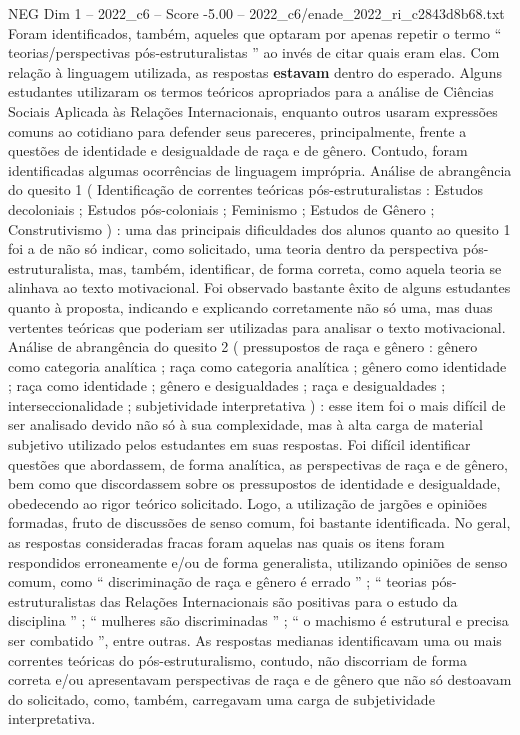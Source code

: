 \begin{textsample}{NEG Dim 1 – 2022\_c6 – Score -5.00 – 2022\_c6/enade\_2022\_ri\_c2843d8b68.txt}
Foram identificados, também, aqueles que optaram por apenas repetir o termo “ teorias/perspectivas pós-estruturalistas ” ao invés de citar quais eram elas.
Com relação à linguagem utilizada, as respostas \textbf{estavam} dentro do esperado.
Alguns estudantes utilizaram os termos teóricos apropriados para a análise de Ciências Sociais Aplicada às Relações Internacionais, enquanto outros usaram expressões comuns ao cotidiano para defender seus pareceres, principalmente, frente a questões de identidade e desigualdade de raça e de gênero.
Contudo, foram identificadas algumas ocorrências de linguagem imprópria.
Análise de abrangência do quesito 1 ( Identificação de correntes teóricas pós-estruturalistas : Estudos decoloniais ; Estudos pós-coloniais ; Feminismo ; Estudos de Gênero ; Construtivismo ) : uma das principais dificuldades dos alunos quanto ao quesito 1 foi a de não só indicar, como solicitado, uma teoria dentro da perspectiva pós-estruturalista, mas, também, identificar, de forma correta, como aquela teoria se alinhava ao texto motivacional.
Foi observado bastante êxito de alguns estudantes quanto à proposta, indicando e explicando corretamente não só uma, mas duas vertentes teóricas que poderiam ser utilizadas para analisar o texto motivacional.
Análise de abrangência do quesito 2 ( pressupostos de raça e gênero : gênero como categoria analítica ; raça como categoria analítica ; gênero como identidade ; raça como identidade ; gênero e desigualdades ; raça e desigualdades ; interseccionalidade ; subjetividade interpretativa ) : esse item foi o mais difícil de ser analisado devido não só à sua complexidade, mas à alta carga de material subjetivo utilizado pelos estudantes em suas respostas.
Foi difícil identificar questões que abordassem, de forma analítica, as perspectivas de raça e de gênero, bem como que discordassem sobre os pressupostos de identidade e desigualdade, obedecendo ao rigor teórico solicitado.
Logo, a utilização de jargões e opiniões formadas, fruto de discussões de senso comum, foi bastante identificada.
No geral, as respostas consideradas fracas foram aquelas nas quais os itens foram respondidos erroneamente e/ou de forma generalista, utilizando opiniões de senso comum, como “ discriminação de raça e gênero é errado ” ; “ teorias pós-estruturalistas das Relações Internacionais são positivas para o estudo da disciplina ” ; “ mulheres são discriminadas ” ; “ o machismo é estrutural e precisa ser combatido ”, entre outras.
As respostas medianas identificavam uma ou mais correntes teóricas do pós-estruturalismo, contudo, não discorriam de forma correta e/ou apresentavam perspectivas de raça e de gênero que não só destoavam do solicitado, como, também, carregavam uma carga de subjetividade interpretativa.

\end{textsample}
